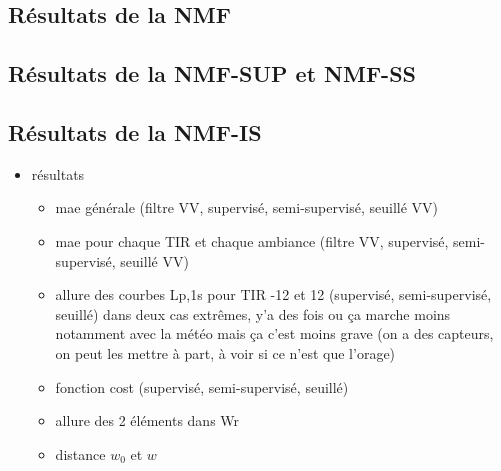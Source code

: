 \begin{table}[]
\centering
\caption{Erreur XXX de l'estimateur \textit{baseline} selon $f_c$ sur l'ensemble du corpus \textit{Ambiance} et pour chaque TIR}
\label{tab:resuls_ambiance_filtre}
\end{table}


\subsection{Résultats de la NMF}

\subsection{Résultats de la NMF-SUP et NMF-SS}

\subsection{Résultats de la NMF-IS}


\begin{itemize}


\item résultats
\begin{itemize}
\item mae générale (filtre VV, supervisé, semi-supervisé, seuillé VV)
\item mae pour chaque TIR et chaque ambiance (filtre VV, supervisé, semi-supervisé, seuillé VV)
\item allure des courbes Lp,1s pour TIR -12 et 12 (supervisé, semi-supervisé, seuillé) dans deux cas extrêmes, y'a des fois ou ça marche moins notamment avec la météo mais ça c'est moins grave (on a des capteurs, on peut les mettre à part, à voir si ce n'est que l'orage)
\item fonction cost (supervisé, semi-supervisé, seuillé)
\item allure des 2 éléments dans Wr
\item distance $w_0$ et $w$
\end{itemize}
\end{itemize}


